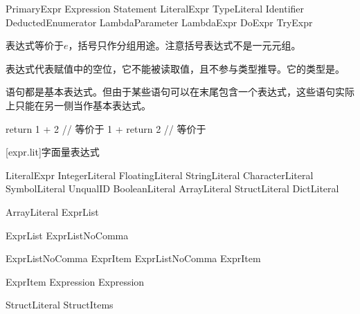 \begin{bnf}{PrimaryExpr}
    \terminal{(} Expression \terminal{)} \br
    \terminal{_} \br
    Statement \br
    LiteralExpr \br
    TypeLiteral \br
    Identifier \br
    DeductedEnumerator \br
     \br
    \terminal{\$} \br
    LambdaParameter \br
    LambdaExpr \br
    DoExpr \br
    TryExpr
\end{bnf}

\pnum
表达式等价于$e$，括号只作分组用途。\enternote 注意括号表达式不是一元元组。\exitnote

\pnum
表达式\tcode{_}代表赋值中的空位，它不能被读取值，且不参与类型推导。它的类型是。

\pnum
语句都是基本表达式。但由于某些语句可以在末尾包含一个表达式，这些语句实际上只能在另一侧当作基本表达式。

\enterexample
\begin{codeblock}

return 1 + 2 // 等价于
1 + return 2 // 等价于

\end{codeblock}
\exitexample

[expr.lit]{字面量表达式}

\begin{bnf}{LiteralExpr}
    IntegerLiteral \br
    FloatingLiteral \br
    StringLiteral \br
    CharacterLiteral \br
    SymbolLiteral \br
     UnqualID \terminal{)} \br
    BooleanLiteral \br
     \br
    ArrayLiteral \br
    StructLiteral \br
    DictLiteral
\end{bnf}

\begin{bnf}{ArrayLiteral}
    \terminal{[} ExprList\bnfq \terminal{]}
\end{bnf}

\begin{bnf}{ExprList}
    ExprListNoComma \terminal{,}\bnfq
\end{bnf}

\begin{bnf}{ExprListNoComma}
    ExprItem \br
    ExprListNoComma \terminal{,} ExprItem
\end{bnf}

\begin{bnf}{ExprItem}
    Expression \br
     Expression\bnfq
\end{bnf}

\begin{bnf}{StructLiteral}
    \terminal{(} StructItems\bnfq \terminal{)}
\end{bnf}

